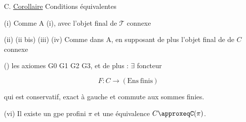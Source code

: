 
C. \uline{Corollaire} Conditions équivalentes

(i) Comme A (i), avec l'objet final de $\mathscr T$ connexe

(ii) (ii bis) (iii) (iv) Comme dans A, en supposant de plus l'objet final de de $C$ connexe

()   les axiomes G0 G1 G2 G3, et de plus : $\exists$ foncteur 

\[
F:C\longrightarrow(\mathrm{Ens\ finis})
\]

qui est conservatif, exact à gauche et commute aux sommes finies.

(vi) Il existe un gpe profini $\pi$ et une équivalence $C\approxeqC(\pi)$.

